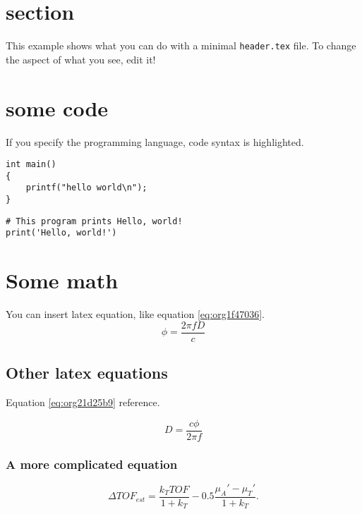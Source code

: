 


\maketitle

\newpage

\section{section}
\label{sec:org0f474dc}
This example shows what you can do with a minimal \texttt{header.tex} file.
To change the aspect of what you see, edit it!

\section{some code}
\label{sec:org1c6eab7}
If you specify the programming language, code syntax is highlighted.
\begin{verbatim}
int main()
{
    printf("hello world\n");
}
\end{verbatim}

\begin{verbatim}
# This program prints Hello, world!
print('Hello, world!')
\end{verbatim}

\section{Some math}
\label{sec:org6ddd12a}
You can insert latex equation, like equation \ref{eq:org1f47036}.
\begin{equation}
\label{eq:org1f47036}
\phi = \frac{2\pi fD}{c}
\end{equation}
\subsection{Other latex equations}
\label{sec:org5c5c713}
Equation \ref{eq:org21d25b9} reference.

\begin{equation}
\label{eq:org21d25b9}
D = \frac{c\phi}{2\pi f}
\end{equation}

\subsubsection{A more complicated equation}
\label{sec:org56ac7fb}

\begin{equation}
\Delta TOF_{est} = \frac{k_T TOF}{1+k_T } - 0.5 \frac{\mu_A' - \mu_T'}{1+k_T}.
\end{equation}


